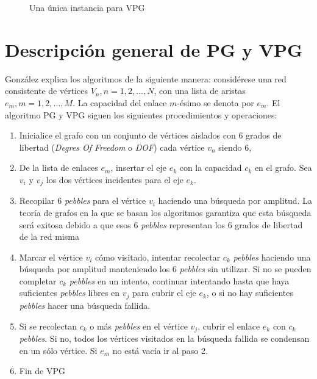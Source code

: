 \begin{figure}
\centering
{}
\caption{Una única instancia para VPG}
\label{fig:instancias-vpg}
\end{figure}

\section{Descripción general de PG y VPG} \label{descripcion-general}
González\parencite{Gonzalez2011} explica los algoritmos de la siguiente manera: considérese una red consistente de vértices ${V_n}, n=1,2,\ldots,N$, con una lista de aristas ${e_m}, m=1,2,\ldots,M$. La capacidad del enlace $m$-ésimo se denota por $e_m$. El algoritmo PG y VPG siguen los siguientes procedimientos y operaciones:

\begin{enumerate}
	\item Inicialice el grafo con un conjunto de vértices aislados con 6 grados de libertad (\emph{Degres Of Freedom} o \emph{DOF}) cada vértice $v_n$ siendo 6,
	\item De la lista de enlaces ${e_m}$, insertar el eje $e_k$ con la capacidad $c_k$ en el grafo. Sea $v_i$ y $v_j$ los dos vértices incidentes para el eje $e_k$.
	\item Recopilar 6 \emph{pebbles} para el vértice $v_i$ haciendo una búsqueda por amplitud. La teoría de grafos en la que se basan los algoritmos garantiza que esta búsqueda será exitosa debido a que esos 6 \emph{pebbles} representan los 6 grados de libertad de la red misma
	\item Marcar el vértice {$v_i$} cómo visitado, intentar recolectar $c_k$ \emph{pebbles} haciendo una búsqueda por amplitud manteniendo los 6 \emph{pebbles} sin utilizar. Si no se pueden completar $c_k$ \emph{pebbles} en un intento, continuar intentando hasta que haya suficientes \emph{pebbles} libres en $v_j$ para cubrir el eje $e_k$, o si no hay suficientes \emph{pebbles} hacer una búsqueda fallida.
	\item Si se recolectan $c_k$ o más \emph{pebbles} en el vértice $v_j$, cubrir el enlace $e_k$ con $c_k$ \emph{pebbles}. Si no, todos los vértices visitados en la búsqueda fallida se condensan en un sólo vértice. Si ${e_m}$ no está vacía ir al paso 2.
	\item Fin de VPG
\end{enumerate}


